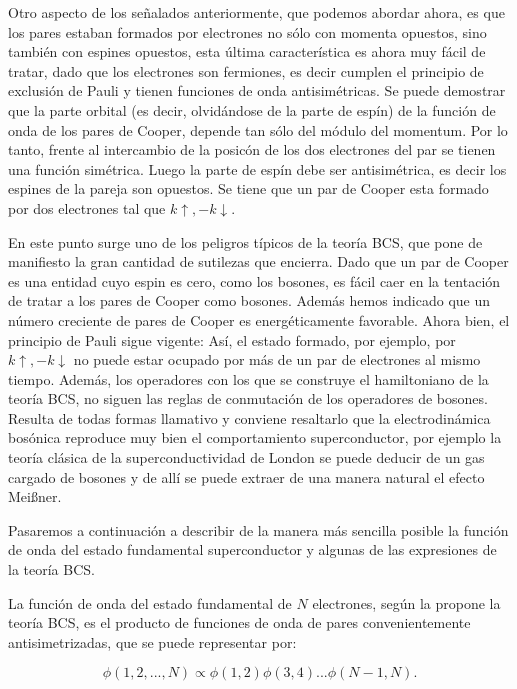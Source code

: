 Otro aspecto de los señalados anteriormente, que podemos abordar ahora, es que los pares estaban formados por electrones no sólo con momenta opuestos, sino también con espines opuestos, esta última característica es ahora muy fácil de tratar, dado que los electrones son fermiones, es decir cumplen el principio de exclusión de Pauli y tienen funciones de onda antisimétricas. Se puede demostrar que la parte orbital (es decir, olvidándose de la parte de espín) de la función de onda de los pares de Cooper, depende tan sólo del módulo del momentum. Por lo tanto, frente al intercambio de la posicón de los dos electrones del par se tienen una función simétrica. Luego la parte de espín debe ser antisimétrica, es decir los espines de la pareja son opuestos. Se tiene que un par de Cooper esta formado por dos electrones tal que $k \uparrow, -k \downarrow$.

En este punto surge uno de los peligros típicos de la teoría BCS, que pone de manifiesto la gran cantidad de sutilezas que encierra. Dado que un par de Cooper es una entidad cuyo espin es cero, como los bosones, es fácil caer en la tentación de tratar a los pares de Cooper como bosones. Además hemos indicado que un número creciente de pares de Cooper es energéticamente favorable. Ahora bien, el principio de Pauli sigue vigente: Así, el estado formado, por ejemplo, por $k \uparrow, -k \downarrow$ no puede estar ocupado por más de un par de electrones al mismo tiempo. Además, los operadores con los que se construye el hamiltoniano de la teoría BCS, no siguen las reglas de conmutación de los operadores de bosones. Resulta de todas formas llamativo y conviene resaltarlo que la electrodinámica bosónica reproduce muy bien el comportamiento superconductor, por ejemplo la teoría clásica de la superconductividad de London se puede deducir de un gas cargado de bosones y de allí se puede extraer de una manera natural el efecto Meißner.

Pasaremos a continuación a describir de la manera más sencilla posible la función de onda del estado fundamental superconductor y algunas de las expresiones de la teoría BCS.

La función de onda del estado fundamental de $N$ electrones, según la propone la teoría BCS, es el producto de funciones de onda de pares convenientemente antisimetrizadas, que se puede representar por:

\begin{equation}
    \phi(1,2,...,N) \propto \phi(1,2)\phi(3,4)...\phi(N-1,N) .
\end{equation}

